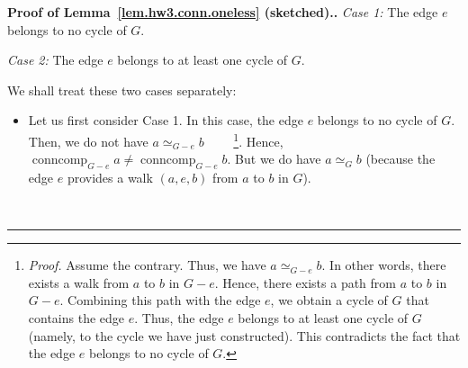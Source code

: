 \documentclass[numbers=enddot,12pt,final,onecolumn,notitlepage]{scrartcl}%
\theoremstyle{definition}
\newenvironment{proof}[1][Proof]{\noindent\textbf{#1.} }{\ \rule{0.5em}{0.5em}}
\newcommand{\conncomp}{\operatorname{conncomp}}
\newcommand{\set}[1]{\left\{ #1 \right\}}
\newcommand{\tup}[1]{\left( #1 \right)}
\begin{document}
\begin{proof}[Proof of Lemma~\ref{lem.hw3.conn.oneless} (sketched).]
\textit{Case 1:} The edge $e$ belongs to no cycle of $G$.

\textit{Case 2:} The edge $e$ belongs to at least one cycle of $G$.

We shall treat these two cases separately:

\begin{itemize}

\item Let us first consider Case 1.
      In this case, the edge $e$ belongs to no cycle of $G$.
      Then, we do not have $a \simeq_{G - e} b$
      \ \ \ \ \footnote{\textit{Proof.} Assume the contrary. Thus,
        we have $a \simeq_{G - e} b$.
        In other words, there exists a walk from $a$ to $b$ in
        $G - e$.
        Hence, there exists a path from $a$ to $b$ in $G - e$.
        Combining this path with the edge $e$, we obtain a cycle of
        $G$ that contains the edge $e$.
        Thus, the edge $e$ belongs to at least one cycle of $G$
        (namely, to the cycle we have just constructed).
        This contradicts the fact that the edge $e$ belongs to no
        cycle of $G$.}.
      Hence, $\conncomp_{G - e} a \neq \conncomp_{G - e} b$.
      But we do have $a \simeq_G b$ (because the edge
      $e$ provides a walk $\tup{a, e, b}$ from $a$ to $b$ in $G$).

\end{itemize}
\end{proof}
\end{document}

